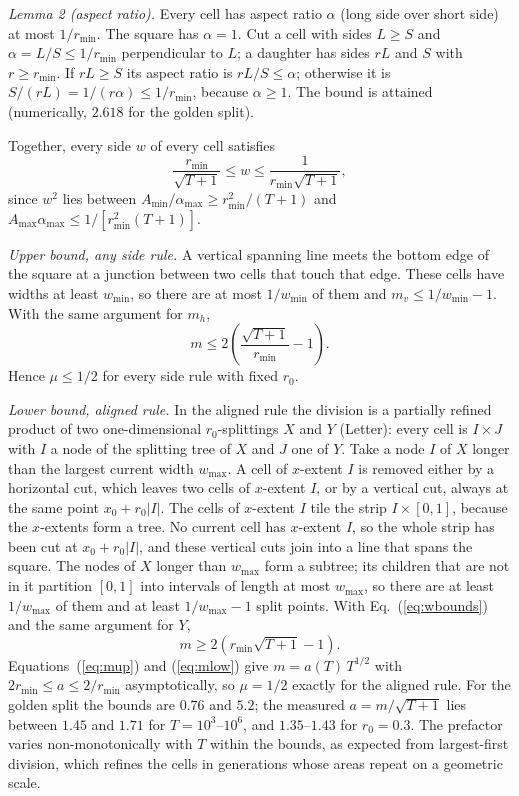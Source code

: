 \documentclass[aps,prl,onecolumn,superscriptaddress,amsmath,amssymb,floatfix]{revtex4-2}
\begin{document}
\textit{Lemma 2 (aspect ratio).} Every cell has aspect ratio $\alpha$ (long side over short side)
at most $1/r_{\min}$. The square has $\alpha=1$. Cut a cell with sides $L\ge S$ and
$\alpha=L/S\le1/r_{\min}$ perpendicular to $L$; a daughter has sides $rL$ and $S$ with $r\ge
r_{\min}$. If $rL\ge S$ its aspect ratio is $rL/S\le\alpha$; otherwise it is $S/(rL)=1/(r\alpha)\le
1/r_{\min}$, because $\alpha\ge1$. The bound is attained (numerically, $2.618$ for the golden
split).

Together, every side $w$ of every cell satisfies
\begin{equation}
\frac{r_{\min}}{\sqrt{T+1}}\le w\le\frac{1}{r_{\min}\sqrt{T+1}} ,
\label{eq:wbounds}
\end{equation}
since $w^{2}$ lies between $A_{\min}/\alpha_{\max}\ge r_{\min}^{2}/(T+1)$ and
$A_{\max}\alpha_{\max}\le1/[r_{\min}^{2}(T+1)]$.

\textit{Upper bound, any side rule.} A vertical spanning line meets the bottom edge of the
square at a junction between two cells that touch that edge. These cells have widths at least
$w_{\min}$, so there are at most $1/w_{\min}$ of them and $m_v\le1/w_{\min}-1$. With the same
argument for $m_h$,
\begin{equation}
m\le2\left(\frac{\sqrt{T+1}}{r_{\min}}-1\right).
\label{eq:mup}
\end{equation}
Hence $\mu\le1/2$ for every side rule with fixed $r_0$.

\textit{Lower bound, aligned rule.} In the aligned rule the division is a partially refined
product of two one-dimensional $r_0$-splittings $X$ and $Y$ (Letter): every cell is $I\times J$
with $I$ a node of the splitting tree of $X$ and $J$ one of $Y$. Take a node $I$ of $X$ longer
than the largest current width $w_{\max}$. A cell of $x$-extent $I$ is removed either by a horizontal cut, which leaves two cells of
$x$-extent $I$, or by a vertical cut, always at the same point $x_0+r_0|I|$. The cells of
$x$-extent $I$ tile the strip $I\times[0,1]$, because the $x$-extents form a tree. No current
cell has $x$-extent $I$, so the whole strip has been cut at $x_0+r_0|I|$, and these vertical
cuts join into a line that spans the square. The nodes of $X$ longer than $w_{\max}$ form a subtree; its children that are not in it
partition $[0,1]$ into intervals of length at most $w_{\max}$, so there are at least
$1/w_{\max}$ of them and at least $1/w_{\max}-1$ split points. With Eq.~(\ref{eq:wbounds}) and
the same argument for $Y$,
\begin{equation}
m\ge2\left(r_{\min}\sqrt{T+1}-1\right).
\label{eq:mlow}
\end{equation}
Equations~(\ref{eq:mup}) and (\ref{eq:mlow}) give $m=a(T)\,T^{1/2}$ with
$2r_{\min}\le a\le2/r_{\min}$ asymptotically, so $\mu=1/2$ exactly for the aligned rule. For the
golden split the bounds are $0.76$ and $5.2$; the measured $a=m/\sqrt{T+1}$ lies between $1.45$
and $1.71$ for $T=10^{3}$--$10^{6}$, and $1.35$--$1.43$ for $r_0=0.3$. The prefactor varies
non-monotonically with $T$ within the bounds, as expected from largest-first division, which
refines the cells in generations whose areas repeat on a geometric scale.
\end{document}

